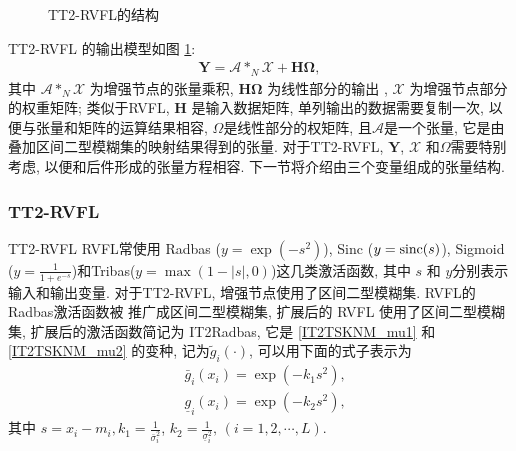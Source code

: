 \begin{figure} [!htbp]
\begin{center}
\caption{TT2-RVFL的结构}
\label{TensorRVFL20180927-2}
\end{center}
\end{figure}
TT2-RVFL 的输出模型如图 \ref{TensorRVFL20180927-2}:
\begin{align}
    \bm Y=\mathcal A *_N \mathcal X+\bm H \bm \Omega,\label{TensorRVFLEq05}
\end{align}
其中 $\mathcal A *_N \mathcal X$ 为增强节点的张量乘积, $\bm H \bm \Omega$ 为线性部分的输出 , $\mathcal X$ 为增强节点部分的权重矩阵;
类似于RVFL, $\bm H$ 是输入数据矩阵, 单列输出的数据需要复制一次, 以便与张量和矩阵的运算结果相容, $\Omega$是线性部分的权矩阵, 且$\mathcal A$是一个张量, 它是由 叠加区间二型模糊集的映射结果得到的张量.
对于TT2-RVFL, $\bm Y$, $\mathcal X$ 和$\Omega$需要特别考虑, 以便和后件形成的张量方程相容. 下一节将介绍由三个变量组成的张量结构.
\subsubsection{TT2-RVFL} {TT2-RVFL}
RVFL常使用 Radbas ($y = \exp(-s^2)$), Sinc ($y = \textup{sinc} (s)$), Sigmoid ($y = \frac 1 {1+e^{-s} } $)和Tribas($y = \max(1 - |s|, 0)$)这几类激活函数, 其中 $s$ 和 $y$分别表示输入和输出变量.
对于TT2-RVFL, 增强节点使用了区间二型模糊集. RVFL的 Radbas激活函数被 推广成区间二型模糊集, 扩展后的 RVFL 使用了区间二型模糊集, 扩展后的激活函数简记为 IT2Radbas, 它是 \eqref{IT2TSKNM_mu1} 和 \eqref{IT2TSKNM_mu2} 的变种,
记为$\tilde g_i(\cdot)$, 可以用下面的式子表示为
 \begin{align}
  &\bar{g} _{i} (x_i)=\exp(-k_1 s^2),\label{IT2TSKNM_g1} \\
  &\underline{g} _{i} (x_i)=\exp(-k_2 s^2),\label{IT2TSKNM_g2}
\end{align}
其中 $s=x_i-m_{i}, k_1=\frac{1} {\bar{\sigma} ^2_{i} } $, $k_2=\frac{1} {\underline{\sigma} ^2_{i} },\, (i=1,2,\cdots, L)$.

